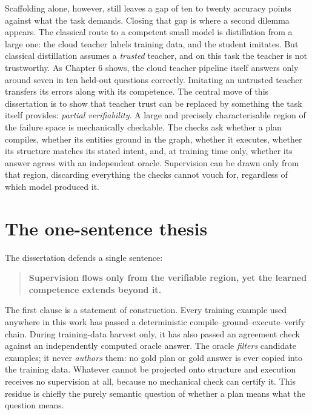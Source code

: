 Scaffolding alone, however, still leaves a gap of ten to twenty accuracy points against what the task demands. Closing that gap is where a second dilemma appears. The classical route to a competent small model is distillation from a large one: the cloud teacher labels training data, and the student imitates. But classical distillation assumes a \emph{trusted} teacher, and on this task the teacher is not trustworthy. As Chapter 6 shows, the cloud teacher pipeline itself answers only around seven in ten held-out questions correctly. Imitating an untrusted teacher transfers its errors along with its competence. The central move of this dissertation is to show that teacher trust can be replaced by something the task itself provides: \emph{partial verifiability}. A large and precisely characterisable region of the failure space is mechanically checkable. The checks ask whether a plan compiles, whether its entities ground in the graph, whether it executes, whether its structure matches its stated intent, and, at training time only, whether its answer agrees with an independent oracle. Supervision can be drawn only from that region, discarding everything the checks cannot vouch for, regardless of which model produced it.

\section{The one-sentence thesis}\label{sec:the-one-sentence-thesis}

The dissertation defends a single sentence:

\begin{quote}
\textbf{Supervision flows only from the verifiable region, yet the learned competence extends beyond it.}
\end{quote}

The first clause is a statement of construction. Every training example used anywhere in this work has passed a deterministic compile--ground--execute--verify chain. During training-data harvest only, it has also passed an agreement check against an independently computed oracle answer. The oracle \emph{filters} candidate examples; it never \emph{authors} them: no gold plan or gold answer is ever copied into the training data. Whatever cannot be projected onto structure and execution receives no supervision at all, because no mechanical check can certify it. This residue is chiefly the purely semantic question of whether a plan means what the question means.

